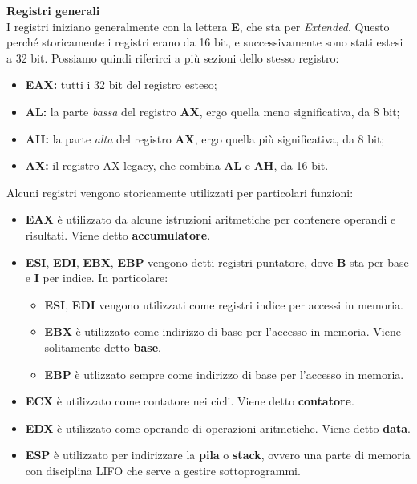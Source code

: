 \documentclass[a4paper,11pt]{article}
\begin{document}
\par\medskip
\noindent
\textbf{\textsf{Registri generali}} \\
I registri iniziano generalmente con la lettera \textbf{E}, che sta per \textit{Extended}.
Questo perché storicamente i registri erano da 16 bit, e successivamente sono stati estesi a 32 bit.
Possiamo quindi riferirci a più sezioni dello stesso registro:
\begin{itemize}
	\item \textbf{EAX:} tutti i 32 bit del registro esteso;
	\item \textbf{AL:} la parte \textit{bassa} del registro \textbf{AX}, ergo quella meno significativa, da 8 bit;
	\item \textbf{AH:} la parte \textit{alta} del registro \textbf{AX}, ergo quella più significativa, da 8 bit;
	\item \textbf{AX:} il registro AX legacy, che combina \textbf{AL} e \textbf{AH}, da 16 bit.
 \end{itemize}

Alcuni registri vengono storicamente utilizzati per particolari funzioni:
\begin{itemize}
	\item \textbf{EAX} è utilizzato da alcune istruzioni aritmetiche per contenere operandi e risultati. Viene detto \textbf{accumulatore}.
	\item \textbf{ESI}, \textbf{EDI}, \textbf{EBX}, \textbf{EBP} vengono detti registri puntatore, dove \textbf{B} sta per base e \textbf{I} per indice. In particolare:
		\begin{itemize}
			\item \textbf{ESI}, \textbf{EDI} vengono utilizzati come registri indice per accessi in memoria.
			\item \textbf{EBX} è utilizzato come indirizzo di base per l'accesso in memoria. Viene solitamente detto \textbf{base}.
			\item \textbf{EBP} è utlizzato sempre come indirizzo di base per l'accesso in memoria.
		\end{itemize}
	\item \textbf{ECX} è utilizzato come contatore nei cicli. Viene detto \textbf{contatore}.
	\item \textbf{EDX} è utilizzato come operando di operazioni aritmetiche. Viene detto \textbf{data}.
	\item \textbf{ESP} è utilizzato per indirizzare la \textbf{pila} o \textbf{stack}, ovvero una parte di memoria con disciplina LIFO che serve a gestire sottoprogrammi.
\end{itemize}
\end{document}
